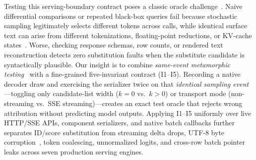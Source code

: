 \documentclass[11pt,letterpaper]{article}
\begin{document}
Testing this serving-boundary contract poses a classic oracle challenge~\cite{barr}. Naive differential comparisons or repeated black-box queries fail because stochastic sampling legitimately selects different tokens across calls, while identical surface text can arise from different tokenizations, floating-point reductions, or KV-cache states~\cite{monitor}. Worse, checking response schemas, row counts, or rendered text reconstruction detects zero substitution faults when the substitute candidate is syntactically plausible. Our insight is to combine \emph{same-event metamorphic testing}~\cite{segura,chenmt} with a fine-grained five-invariant contract (\textsc{I1}--\textsc{I5}). Recording a native decoder draw and exercising the serializer twice on that \emph{identical sampling event}---toggling only candidate-list width ($k=0$ vs.\ $k>0$) or transport mode (non-streaming vs.\ SSE streaming)---creates an exact test oracle that rejects wrong attribution without predicting model outputs. Applying \textsc{I1}--\textsc{I5} uniformly over live HTTP/SSE APIs, component serializers, and native batch callbacks further separates ID/score substitution from streaming delta drops, UTF-8 byte corruption~\cite{utf8plumbing}, token coalescing, unnormalized logits, and cross-row batch pointer leaks across seven production serving engines.
\end{document}

